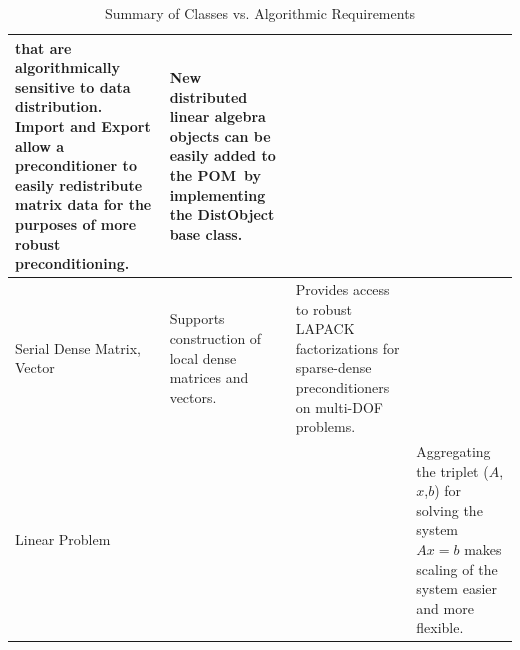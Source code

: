 \documentclass[10pt,relax]{PetraObjectModel}
\newcommand{\POM}{POM}
\begin{document}
\begin{table}
\begin{tabular}{|p{0.8in}||p{1.5in}|p{1.5in}|p{1.5in}|}
    that are algorithmically sensitive to data distribution.
    Import and Export allow a preconditioner to easily redistribute matrix data for the purposes
    of more robust preconditioning. &
    New distributed linear algebra objects can be easily added to
    the \POM\ by implementing the DistObject base class.& \\\hline
    Serial Dense Matrix, Vector & Supports construction of local dense matrices and vectors.&
    Provides access to robust LAPACK factorizations for sparse-dense preconditioners on multi-DOF problems. & \\\hline
    Linear Problem & & & Aggregating the triplet ($A$,$x$,$b$) for solving the system $Ax=b$ makes scaling of the system easier
    and more flexible. \\\hline

  \end{tabular}
  \caption{Summary of Classes vs. Algorithmic Requirements}\label{Table:ClassesVsAlgRequirements}
\end{table}
\end{document}
